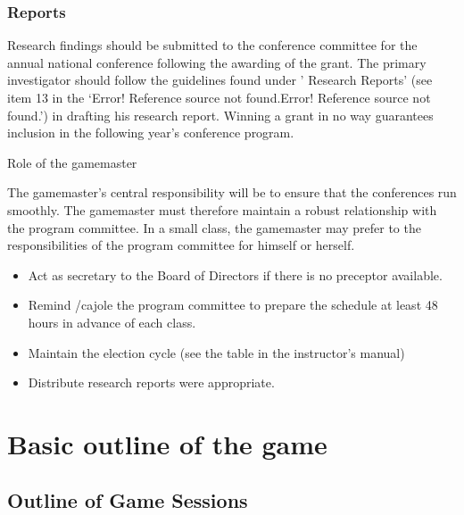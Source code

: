 \subsubsection{Reports}
\label{reports}

Research findings should be submitted to the conference committee for the annual national conference following the awarding of the grant. The primary investigator should follow the guidelines found under ' Research Reports' (see item 13 in the `Error! Reference source not found.Error! Reference source not found.') in drafting his research report. Winning a grant in no way guarantees inclusion in the following year's conference program.

Role of the gamemaster

The gamemaster's central responsibility will be to ensure that the conferences run smoothly. The gamemaster must therefore maintain a robust relationship with the program committee. In a small class, the gamemaster may prefer to the responsibilities of the program committee for himself or herself.

\begin{itemize}
\item Act as secretary to the Board of Directors if there is no preceptor available.

\item Remind \slash  cajole the program committee to prepare the schedule at least 48 hours in advance of each class.

\item Maintain the election cycle (see the table in the instructor's manual)

\item Distribute research reports were appropriate.

\end{itemize}

\section{Basic outline of the game}
\label{basicoutlineofthegame}

\subsection{Outline of Game Sessions}
\label{outlineofgamesessions}


